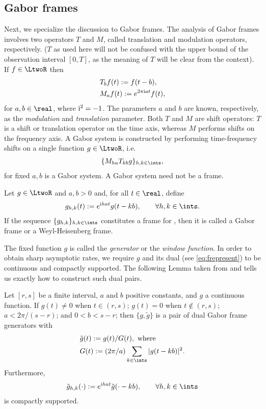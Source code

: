 \subsection{ Gabor frames}
Next, we specialize the discussion to Gabor frames. The analysis of Gabor frames involves two operators $T$ and $M$, called  translation and modulation operators, respectively. ($T$ as used here will not be confused with the upper bound of the observation interval $[0,T]$, as the meaning of $T$ will be clear from the context). If $f \in \LtwoR$ then 
\begin{align}
  & T_bf(t) := f(t -  b),  \label{eq:translation}\\
  & M_af(t) := e^{2\pi \mathrm{i} at}f(t), \label{eq:modulation} 
\end{align}
for $a,b \in \real$, where $\mathrm{i}^2 = -1$. The parameters $a$ and $b$ are known, respectively, as the \emph{modulation} and \emph{translation} parameter. Both $T$ and $M$ are shift operators: $T$ is a shift or translation operator on the time axis, whereas $M$ performs shifts on the frequency axis. A Gabor system is constructed by performing time-frequency shifts on a single function $g \in \LtwoR$, i.e. 
\begin{align}
  \{M_{ha} T_{kb} g\}_{h,k \in \ints},\notag
  \label{}
\end{align}
for fixed $a,b$ is a Gabor system. A Gabor system need not be a frame.
\begin{defn}
  Let $g \in \LtwoR$ and $a,b >0$ and,  for all $t \in \real$, define  
\begin{align}
  g_{h,k}(t) := e^{\i h a t }g(t - k b), \qquad  \forall h,k \in \ints. \notag    
 \end{align}
  If the sequence $\{g_{h,k}\}_{h,k \in \ints}$ constitutes a  frame for \LtwoR, then it is called a Gabor frame or a Weyl-Heisenberg frame. 
\end{defn}
\noindent The fixed function $g$ is called  the \emph{generator} or the \emph{window function}.  
In order to obtain sharp asymptotic rates, we require $g$ and its dual \tg (see \eqref{eq:frepresent}) to be continuous and compactly supported. The following Lemma taken from \cite{Christensen2006} and \cite{Zhang2008} tells us exactly how to construct such dual pairs.
\begin{lem}\label{le:gabor}
  Let $[r,s]$ be a finite interval, $a\text{ and }b$ positive constants,  and $g$ a continuous function. If $g(t) \ne 0$ when $t \in (r,s)$; $g(t) = 0$ when $t \notin (r,s)$; $a < 2\pi/(s-r)$; and $0<b<s-r$; then  $\{g,\tilde{g}\}$ is a pair of dual Gabor frame generators with 
\begin{align}
  &\tilde{g}(t)  := g(t)/G(t), \text{ where} \label{eq:dualg}\\
  &G(t) := (2\pi/a)\sumi|g(t-kb)|^2.\label{eq:capg}
\end{align}
Furthermore, 
\begin{align}
  \tilde{g}_{h,k}(\cdot) := e^{\i h a t} \tilde{g}(\cdot - kb), \qquad \forall h, k \in \ints \label{eq:dualghk}
\end{align}
is compactly supported.   
\end{lem}
